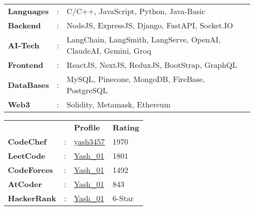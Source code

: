 \documentclass[letterpaper,11pt]{article}
\begin{document}
\begin{minipage}[t]{0.55\textwidth}
  \vspace{1pt}
  \begin{tabular}{>{\raggedright}p{2.2cm} p{0.3cm} p{8.8cm}}
    \textbf{Languages} & : & C/C++, JavaScript, Python, Java-Basic                           \\
    \textbf{Backend}   & : & NodeJS, ExpressJS, Django, FastAPI, Socket.IO                   \\
    \textbf{AI-Tech}   & : & LangChain, LangSmith, LangServe, OpenAI, ClaudeAI, Gemini, Groq \\
    \textbf{Frontend}  & : & ReactJS, NextJS, ReduxJS, BootStrap, GraphQL                    \\
    \textbf{DataBases} & : & MySQL, Pinecone, MongoDB, FireBase, PostgreSQL                  \\
    \textbf{Web3}      & : & Solidity, Metamask, Ethereum                                    \\
  \end{tabular}
\end{minipage}
\hfill
\begin{minipage}[t]{0.40\textwidth}
  \raggedleft
  \vspace{1pt}
  \renewcommand{\arraystretch}{1.1}
  \begin{tabular}{>{\raggedright}p{2.5cm} p{0.1cm} P{2cm} P{2cm}}
    {}                  & {} & \textbf{Profile}                                                          & \textbf{Rating} \\
    \textbf{CodeChef}   & :  & {\href{https://www.codechef.com/users/yash3457}{\underline{yash3457}}}    & 1970            \\
    \textbf{LeetCode}   & :  & {\href{https://leetcode.com/u/Yash_01/}{\underline{Yash\_01}}}            & 1801            \\
    \textbf{CodeForces} & :  & {\href{https://codeforces.com/profile/Yash_01}{\underline{Yash\_01}}}     & 1492            \\
    \textbf{AtCoder}    & :  & {\href{https://atcoder.jp/users/Yash_01}{\underline{Yash\_01}}}           & 843             \\
    \textbf{HackerRank} & :  & {\href{https://www.hackerrank.com/profile/Yash_01}{\underline{Yash\_01}}} & 6-Star          \\
  \end{tabular}
\end{minipage}
\end{document}
